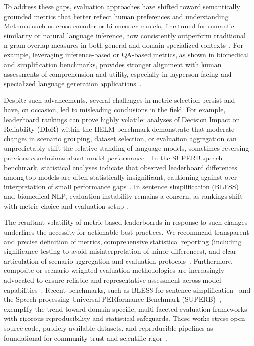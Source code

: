 \documentclass[sigconf]{acmart}
\begin{document}
To address these gaps, evaluation approaches have shifted toward semantically grounded metrics that better reflect human preferences and understanding. Methods such as cross-encoder or bi-encoder models, fine-tuned for semantic similarity or natural language inference, now consistently outperform traditional n-gram overlap measures in both general and domain-specialized contexts~\cite{ref76,ref91,ref94}. For example, leveraging inference-based or QA-based metrics, as shown in biomedical and simplification benchmarks, provides stronger alignment with human assessments of comprehension and utility, especially in layperson-facing and specialized language generation applications~\cite{ref76,ref81,ref94,ref106}.

Despite such advancements, several challenges in metric selection persist and have, on occasion, led to misleading conclusions in the field. For example, leaderboard rankings can prove highly volatile: analyses of Decision Impact on Reliability (DIoR) within the HELM benchmark demonstrate that moderate changes in scenario grouping, dataset selection, or evaluation aggregation can unpredictably shift the relative standing of language models, sometimes reversing previous conclusions about model performance~\cite{ref104}. In the SUPERB speech benchmark, statistical analyses indicate that observed leaderboard differences among top models are often statistically insignificant, cautioning against over-interpretation of small performance gaps~\cite{ref101}. In sentence simplification (BLESS) and biomedical NLP, evaluation instability remains a concern, as rankings shift with metric choice and evaluation setup~\cite{ref94,ref106}.

The resultant volatility of metric-based leaderboards in response to such changes underlines the necessity for actionable best practices. We recommend transparent and precise definition of metrics, comprehensive statistical reporting (including significance testing to avoid misinterpretation of minor differences), and clear articulation of scenario aggregation and evaluation protocols~\cite{ref101,ref104,ref108}. Furthermore, composite or scenario-weighted evaluation methodologies are increasingly advocated to ensure reliable and representative assessment across model capabilities~\cite{ref104,ref106,ref108}. Recent benchmarks, such as BLESS for sentence simplification~\cite{ref106} and the Speech processing Universal PERformance Benchmark (SUPERB)~\cite{ref101}, exemplify the trend toward domain-specific, multi-faceted evaluation frameworks with rigorous reproducibility and statistical safeguards. These works stress open-source code, publicly available datasets, and reproducible pipelines as foundational for community trust and scientific rigor~\cite{ref101,ref106,ref108}.
\end{document}

